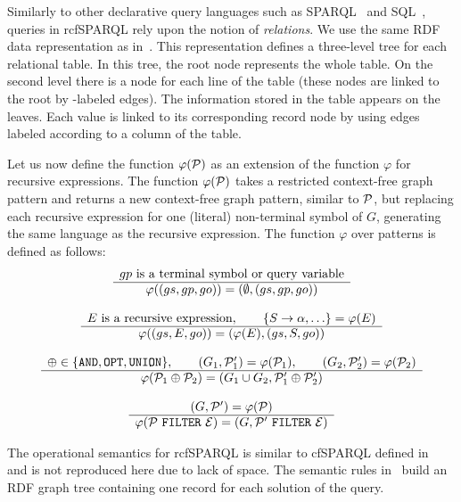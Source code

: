 \documentclass[runningheads]{llncs}
\begin{document}
Similarly to other declarative query languages such as SPARQL~\cite{SPARQL} and SQL~\cite{sql}, queries in \textsf{rcfSPARQL} rely upon the notion of \emph{relations}.
We use the same RDF data representation as in~\cite{MEDEIROS2019}.
This representation defines a three-level tree for each relational table.
In this tree, the root node represents the whole table.
On the second level there is a node for each line of the table (these nodes are linked to the root by \rec-labeled edges).
The information stored in the table appears on the leaves.
Each value is linked to its corresponding record node by using edges labeled according to a column of the table.




Let us now define the function $\varphi({\cal P})$ as an extension of the function $\varphi$ for recursive expressions.
The function $\varphi({\cal P})$ takes a restricted context-free graph pattern and returns a new context-free graph pattern, similar to ${\cal P}$, but replacing each recursive expression for one (literal) non-terminal symbol of $G$, generating the same language as the recursive expression.
The function $\varphi$ over patterns is defined as follows:
\[
\pfrule{
gp\mbox{ is a terminal symbol or query variable}%
}{
\varphi((gs, gp, go)) = (\emptyset, (gs, gp, go))
}
\]

\[
\pfrule{
E\mbox{ is a recursive expression}, \qquad
\set{\Rule{S}{\alpha}, \dots} = \varphi(E)
}{
\varphi((gs, E, go)) = (\varphi(E), (gs, S, go))
}
\]

\[
\begin{array}{c} 
\oplus \in \{ \texttt{AND}, \texttt{OPT}, \texttt{UNION} \}, \qquad
(G_1, {\cal P}'_1) = \varphi({\cal P}_1), \qquad
(G_2, {\cal P}'_2) = \varphi({\cal P}_2)
 \\ \hline 
\varphi({\cal P}_1 \oplus {\cal P}_2) = ( G_1 \cup G_2, {\cal P}'_1 \oplus {\cal P}'_2)
 \end{array}
\]

\[
\begin{array}{c} 
(G, {\cal P}') = \varphi({\cal P})
 \\ \hline 
\varphi({\cal P}\   \texttt{FILTER}\ {\cal E}) = ( G, {\cal P}'\ \texttt{FILTER}\ {\cal E})
 \end{array}
\]

The operational semantics for \textsf{rcfSPARQL} is similar to cfSPARQL defined in~\cite{MEDEIROS2019} and is not reproduced here due to lack of space.
The semantic rules in~\cite{MEDEIROS2019} build an RDF graph tree containing one record for each solution of the query.
\end{document}
